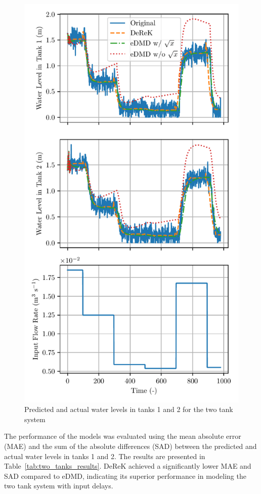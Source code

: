 \documentclass[conference]{IEEEtran}
\begin{document}
\begin{figure}[htbp]\label{fig:two_tanks_results}
    \centerline{\includegraphics[width=\linewidth]{figures/dmdc_multipred-p0-q0-hm20-hl0.pdf}}
    \caption{Predicted and actual water levels in tanks 1 and 2 for the two tank system}
\end{figure}

The performance of the models was evaluated using the mean absolute error (MAE) and the sum of the absolute differences (SAD) between the predicted and actual water levels in tanks 1 and 2. The results are presented in Table~\ref{tab:two_tanks_results}. DeReK achieved a significantly lower MAE and SAD compared to eDMD, indicating its superior performance in modeling the two tank system with input delays.
\end{document}
